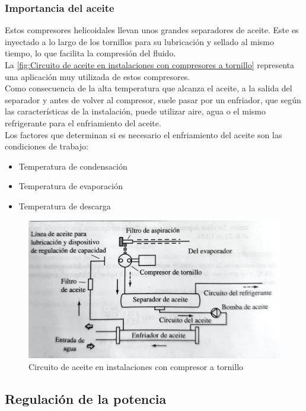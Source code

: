 \subsubsection{Importancia del aceite}
Estos compresores helicoidales llevan unos grandes separadores de aceite. Este es inyectado a lo largo de los tornillos para su lubricaci\'on y sellado al mismo tiempo, lo que facilita la compresi\'on del fluido.\\ La \autoref{fig:Circuito de aceite en instalaciones con compresores a tornillo} representa una aplicaci\'on muy utilizada de estos compresores.\\Como consecuencia de la alta temperatura que alcanza el aceite, a la salida del separador y antes de volver al compresor, suele pasar por un enfriador, que seg\'un las caracter\'isticas de la instalaci\'on, puede utilizar aire, agua o el mismo refrigerante para el enfriamiento del aceite.\\ Los factores que determinan si es necesario el enfriamiento del aceite son las condiciones de trabajo:

\begin{itemize}
	\item Temperatura de condensaci\'on
	\item Temperatura de evaporaci\'on
	\item Temperatura de descarga
\end{itemize}

\begin{figure}[H]
	\centering
	\includegraphics[width=\textwidth]{figuras/compresores/circuito de aceite (2).jpg}
	\caption{Circuito de aceite en instalaciones con compresor a tornillo}
	\label{fig:Circuito de aceite en instalaciones con compresores a tornillo}
\end{figure}

\subsection{Regulación de la potencia}

